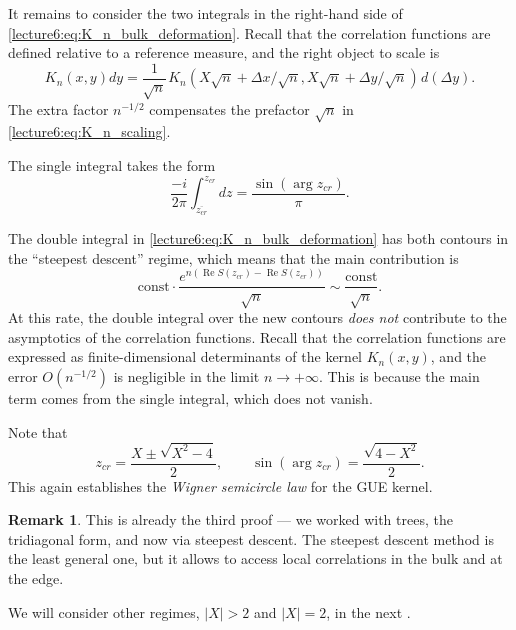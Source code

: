 \documentclass[letterpaper,11pt,oneside,reqno]{book}
\numberwithin{equation}{chapter}  %
\newcommand{\ssp}{\hspace{1pt}}
\theoremstyle{definition}
\newtheorem{remark}[proposition]{Remark}
\begin{document}
It remains to consider the two integrals in the right-hand side
of \eqref{lecture6:eq:K_n_bulk_deformation}.
Recall that the correlation functions are
defined relative to a reference measure, and the right object to scale is
\begin{equation*}
	K_n(x,y)dy=\frac{1}{\sqrt n}
	\ssp
	K_n(X\sqrt n+\Delta x/\sqrt n,X\sqrt n+\Delta y/\sqrt n)
	\ssp d\left( \Delta y \right).
\end{equation*}
The extra factor $n^{-1/2}$
compensates the prefactor $\sqrt n$ in
\eqref{lecture6:eq:K_n_scaling}.

The single integral takes the form
\begin{equation}
	\label{lecture6:eq:K_n_bulk_single}
	\frac{-i}{2\pi}
	\int_{\overline{z_{cr}}}^{z_{cr}}
	dz
	=\frac{\sin(\arg z_{cr})}{\pi}.
\end{equation}

The double integral
in \eqref{lecture6:eq:K_n_bulk_deformation}
has both contours
in the ``steepest descent'' regime, which means that
the main contribution is
\begin{equation*}
	\mathrm{const}\cdot
	\frac{e^{n\left( \operatorname{Re}S(z_{cr})-\operatorname{Re}S(z_{cr}) \right)}}{\sqrt n}
	\sim \frac{\mathrm{const}}{\sqrt n}.
\end{equation*}
At this rate, the double integral over the new contours
\emph{does not} contribute to the asymptotics of the correlation functions.
Recall that the correlation functions are expressed as finite-dimensional
determinants of the kernel $K_n(x,y)$, and the error $O(n^{-1/2})$ is
negligible in the limit $n\to+\infty$.
This is because the main term comes from the single integral,
which does not vanish.

Note that
\begin{equation*}
	z_{cr}=\frac{X\pm \sqrt{X^2-4}}{2},
	\qquad
	\sin(\arg z_{cr})=\frac{\sqrt{4-X^2}}{2}.
\end{equation*}
This again establishes the \emph{Wigner semicircle law} for the GUE kernel.

\begin{remark}
	This is already the third proof --- we worked with trees, the tridiagonal form,
	and now via steepest descent. The steepest descent method is the least general one,
	but it allows to access local correlations in the bulk and at the edge.
\end{remark}

We will consider other regimes, $|X|>2$ and $|X|=2$, in the next
.
\end{document}
